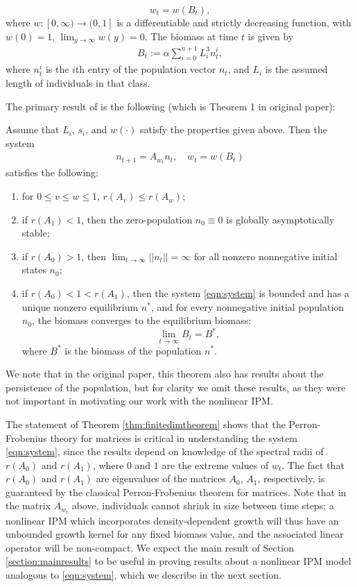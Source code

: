 \[w_t = w(B_t),\]
where $w: [0,\infty) \to (0,1]$ is a differentiable and strictly decreasing function, with $w(0) = 1$, $\lim_{y \to \infty} w(y) = 0$. The biomass at time $t$ is given by
\begin{align}
	B_t := \alpha \sum_{i = 0}^{n+1} L_i^3 n_t^i, \label{eqn:matrixbiomass}
\end{align}
where $n_t^i$ is the $i$th entry of the population vector $n_t$, and $L_i$ is the assumed length of individuals in that class.

The primary result of \cite{Callahan2019} is the following (which is Theorem 1 in original paper):

\begin{theorem} \label{thm:finitedimtheorem}
	Assume that $L_i$, $s_i$, and $w(\cdot)$ satisfy the properties given above. Then the system
	\begin{align}
		n_{t + 1} = A_{w_t} n_t, \quad w_t = w(B_t) \label{eqn:system}
	\end{align}
	satisfies the following:
	\begin{enumerate}
		\item for $0 \leq v \leq w \leq 1$, $r(A_v) \leq r(A_w)$;
		\item if $r(A_1) < 1$, then the zero-population $n_0 \equiv 0$ is globally asymptotically stable;
		\item if $r(A_0) >1$, then $\lim_{t \to \infty} ||n_t|| = \infty$ for all nonzero nonnegative initial states $n_0$;
		\item if $r(A_0) < 1 < r(A_1)$, then the system \eqref{eqn:system} is bounded and has a unique nonzero equilibrium $n^*$, and for every nonnegative initial population $n_0$, the biomass converges to the equilibrium biomass:
		\[\lim_{t \to \infty} B_t = B^*,\]
		where $B^*$ is the biomass of the population $n^*$.
	\end{enumerate}
\end{theorem}
We note that in the original paper, this theorem also has results about the persistence of the population, but for clarity we omit these results, as they were not important in motivating our work with the nonlinear IPM.

The statement of Theorem \ref{thm:finitedimtheorem} shows that the Perron-Frobenius theory for matrices is critical in understanding the system \eqref{eqn:system}, since the results depend on knowledge of the spectral radii of $r(A_0)$ and $r(A_1)$, where $0$ and $1$ are the extreme values of $w_t$. The fact that $r(A_0)$ and $r(A_1)$ are eigenvalues of the matrices $A_0$, $A_1$, respectively, is guaranteed by the classical Perron-Frobenius theorem for matrices. Note that in the matrix $A_{w_t}$ above, individuals cannot shrink in size between time steps; a nonlinear IPM which incorporates density-dependent growth will thus have an unbounded growth kernel for any fixed biomass value, and the associated linear operator will be non-compact. We expect the main result of Section \ref{section:mainresults} to be useful in proving results about a nonlinear IPM model analogous to \eqref{eqn:system}, which we describe in the next section. 

